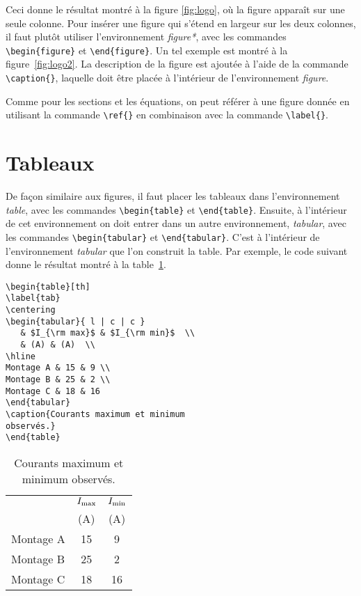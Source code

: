 \documentclass[10pt,letterpaper,twocolumn]{article}
\begin{document}
Ceci donne le résultat montré à la figure \ref{fig:logo}, où la figure apparaît sur une seule colonne. Pour insérer une figure qui s'étend en largeur sur les deux colonnes, il faut plutôt utiliser l'environnement {\em figure*}, avec les commandes \verb+\begin{figure*}+ et \verb+\end{figure*}+. Un tel exemple est montré à la figure~\ref{fig:logo2}. La description de la figure est ajoutée à l'aide de la commande \verb+\caption{}+, laquelle doit être placée à l'intérieur de l'environnement {\em figure}.

Comme pour les sections et les équations, on peut référer à une figure donnée en utilisant la commande \verb|\ref{}| en combinaison avec la commande \verb|\label{}|.

\section{Tableaux}

De façon similaire aux figures, il faut placer les tableaux dans l'environnement {\em table}, avec les commandes \verb+\begin{table}+ et \verb+\end{table}+. Ensuite, à l'intérieur de cet environnement on doit entrer dans un autre environnement, {\em tabular}, avec les commandes \verb+\begin{tabular}+ et \verb+\end{tabular}+. C'est à l'intérieur de l'environnement {\em tabular} que l'on construit la table. Par exemple, le code suivant donne le résultat montré à la table~\ref{tab}.
\begin{verbatim}
\begin{table}[th]
\label{tab}
\centering
\begin{tabular}{ l | c | c }
   & $I_{\rm max}$ & $I_{\rm min}$  \\
   & (A) & (A)  \\
\hline
Montage A & 15 & 9 \\
Montage B & 25 & 2 \\
Montage C & 18 & 16
\end{tabular}
\caption{Courants maximum et minimum
observés.}
\end{table}
\end{verbatim}

\begin{table}[th]
\centering
\begin{tabular}{ l | c | c }
   & $I_{\rm max}$ & $I_{\rm min}$  \\
   & (A) & (A)  \\
\hline
Montage A & 15 & 9 \\
Montage B & 25 & 2 \\
Montage C & 18 & 16
\end{tabular}
\caption{\label{tab} Courants maximum et minimum observés.}
\end{table}
\end{document}
